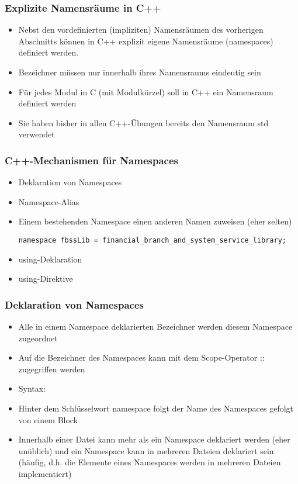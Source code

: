 \subsubsection{Explizite Namensräume in C++\hfill}
\label{sec:Explizite Namensraeume in C++}
\begin{itemize}
	\item Nebst den vordefinierten (impliziten) Namensräumen des vorherigen Abschnitts können in C++ explizit eigene Namensräume (namespaces) definiert werden.
	\item Bezeichner müssen nur innerhalb ihres Namensraums eindeutig sein
	\item Für jedes Modul in C (mit Modulkürzel) soll in C++ ein Namensraum definiert werden
	\item Sie haben bisher in allen C++-Übungen bereits den Namensraum std verwendet
\end{itemize}

\subsubsection{C++-Mechanismen für Namespaces\hfill}
\label{sec:C++-Mechanismen fuer Namespaces}
\begin{itemize}
	\item Deklaration von Namespaces
	\item Namespace-Alias
	\item[\-] Einem bestehenden Namespace einen anderen Namen zuweisen (eher selten)
\noindent
\begin{minipage}{\linewidth}
\begin{lstlisting}
namespace fbssLib = financial_branch_and_system_service_library;
\end{lstlisting}
\end{minipage}
	\item using-Deklaration
	\item using-Direktive
\end{itemize}

\subsubsection{Deklaration von Namespaces\hfill}
\label{sec:Deklaration von Namespaces}
\begin{itemize}
	\item Alle in einem Namespace deklarierten Bezeichner werden diesem Namespace zugeordnet
	\item Auf die Bezeichner des Namespaces kann mit dem Scope-Operator :: zugegriffen werden
	\item Syntax:
	\item[\-] Hinter dem Schlüsselwort namespace folgt der Name des Namespaces gefolgt von einem Block
	\item Innerhalb einer Datei kann mehr als ein Namespace deklariert werden (eher unüblich) und ein Namespace kann in mehreren Dateien deklariert sein (häufig, d.h. die Elemente eines Namespaces werden in mehreren Dateien implementiert)
\end{itemize}

